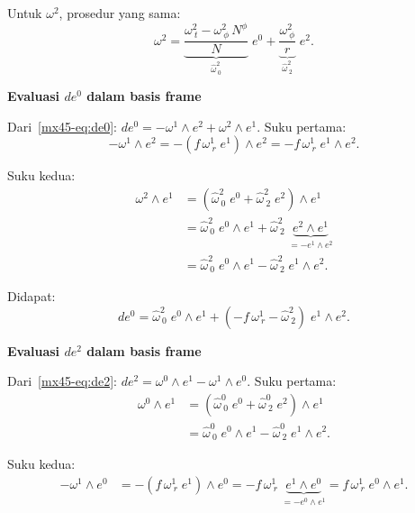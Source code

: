 \noindent Untuk $\omega^2$, prosedur yang sama:
\begin{equation}
    \omega^2 = \underbrace{\frac{\omega^2_{\ t} - \omega^2_{\ \phi}\,N^\phi}{N}}_{\displaystyle \hat\omega^2_{\ 0}}\;e^0
    + \underbrace{\frac{\omega^2_{\ \phi}}{r}}_{\displaystyle \hat\omega^2_{\ 2}}\;e^2. \label{mx45-eq:w2-frame}
\end{equation}

\vspace{0.5em}
\noindent \textbf{Evaluasi $de^0$ dalam basis frame}

Dari~\eqref{mx45-eq:de0}: $de^0 = -\omega^1 \wedge e^2 + \omega^2 \wedge e^1$. Suku pertama:
\begin{equation}
    -\omega^1 \wedge e^2 = -(f\,\omega^1_{\ r}\;e^1) \wedge e^2 = -f\,\omega^1_{\ r}\;e^1 \wedge e^2.
\end{equation}

\noindent Suku kedua:
\begin{align}
    \omega^2 \wedge e^1 &= \left(\hat\omega^2_{\ 0}\;e^0 + \hat\omega^2_{\ 2}\;e^2\right) \wedge e^1 \nonumber\\[4pt]
    &= \hat\omega^2_{\ 0}\;e^0 \wedge e^1 + \hat\omega^2_{\ 2}\;\underbrace{e^2 \wedge e^1}_{= -e^1 \wedge e^2} \nonumber\\[4pt]
    &= \hat\omega^2_{\ 0}\;e^0 \wedge e^1 - \hat\omega^2_{\ 2}\;e^1 \wedge e^2.
\end{align}

\noindent Didapat:
\begin{equation}
    de^0 = \hat\omega^2_{\ 0}\;e^0 \wedge e^1 + \left(-f\,\omega^1_{\ r} - \hat\omega^2_{\ 2}\right)\;e^1 \wedge e^2. \label{mx45-eq:de0-frame}
\end{equation}

\vspace{0.5em}
\noindent \textbf{Evaluasi $de^2$ dalam basis frame}

Dari~\eqref{mx45-eq:de2}: $de^2 = \omega^0 \wedge e^1 - \omega^1 \wedge e^0$. Suku pertama:
\begin{align}
    \omega^0 \wedge e^1 &= \left(\hat\omega^0_{\ 0}\;e^0 + \hat\omega^0_{\ 2}\;e^2\right) \wedge e^1 \nonumber\\[4pt]
    &= \hat\omega^0_{\ 0}\;e^0 \wedge e^1 - \hat\omega^0_{\ 2}\;e^1 \wedge e^2.
\end{align}

\noindent Suku kedua:
\begin{align}
    -\omega^1 \wedge e^0 &= -(f\,\omega^1_{\ r}\;e^1) \wedge e^0
    = -f\,\omega^1_{\ r}\;\underbrace{e^1 \wedge e^0}_{= -e^0 \wedge e^1}
    = f\,\omega^1_{\ r}\;e^0 \wedge e^1.
\end{align}

